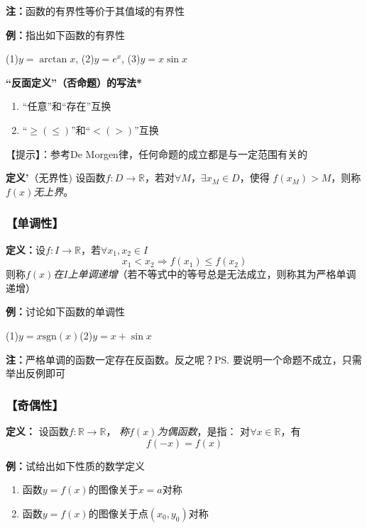 	{\bf 注：}函数的有界性等价于其值域的有界性

	{{\bf 例：}指出如下函数的有界性}
	
		\quad(1)\;$y=\arctan x$,\hspace{2em} (2)\;$y=e^x$,\hspace{2em}
		(3)\;$y=x\sin x$
		
\begin{shaded}
	{\bf “反面定义”（否命题）的写法*}
	\begin{enumerate}
	  \item {“任意”和“存在”互换}
	  \item {“$\geq(\leq)$”和“$<(>)$”互换}
	\end{enumerate}
	
	【提示】：参考De Morgen律，任何命题的成立都是与一定范围有关的
	
	{\bf 定义'}（无界性)
		设函数$f:D\to\mathbb{R}$，若对$\forall M$，$\exists x_M\in D$，使得
		$f(x_M)>M$，则称{\it $f(x)$无上界}。

\end{shaded}		

\subsubsection{【单调性】}

{{\bf 定义：}}设$f:I\to\mathbb{R}$，若$\forall x_1,x_2\in I$
$$x_1<x_2\Rightarrow f(x_1)\leq f(x_2)$$
则称{\it $f(x)$在$I$上单调递增}（若不等式中的等号总是无法成立，则称其为严格单调递增）
	
{{\bf 例：}讨论如下函数的单调性}

	\quad(1)\;$y=x\mathrm{sgn}(x)$\hspace{3cm}(2)\;$y=x+\sin x$

{\bf 注：}严格单调的函数一定存在反函数。反之呢？\ps{要说明一个命题不成立，只需举出反例即可}

\subsubsection{【奇偶性】}

{{\bf 定义：}}
	设函数$f:\mathbb{R}\to\mathbb{R}$，
	{\it 称$f(x)$为偶函数}，是指： 对$\forall x\in\mathbb{R}$，有
	$$f(-x)=f(x)$$

{{\bf 例：}试给出如下性质的数学定义}
\begin{enumerate}[(1)]
  \setlength{\itemindent}{1cm}
  \item 函数$y=f(x)$的图像关于$x=a$对称
  \item 函数$y=f(x)$的图像关于点$(x_0,y_0)$对称
\end{enumerate}

